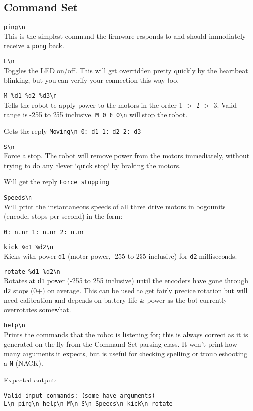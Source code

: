 \subsection{Command Set}

\verb|ping\n|\\
This is the simplest command the firmware responds to and should immediately receive a \verb|pong| back.

\verb|L\n|\\
Toggles the LED on/off. This will get overridden pretty quickly by the heartbeat blinking, but you can verify your connection this way too.

\verb|M %d1 %d2 %d3\n|\\
Tells the robot to apply power to the motors in the order 1 $>$ 2 $>$ 3. Valid range is -255 to 255 inclusive. \verb|M 0 0 0\n| will stop the robot.

Gets the reply \verb|Moving\n 0: d1 1: d2 2: d3|

\verb|S\n|\\
Force a stop. The robot will remove power from the motors immediately, without trying to do any clever `quick stop` by braking the motors.

Will get the reply \verb|Force stopping|

\verb|Speeds\n|\\
Will print the instantaneous speeds of all three drive motors in bogounits (encoder stops per second) in the form:

\verb|0: n.nn 1: n.nn 2: n.nn|

\verb|kick %d1 %d2\n|\\
Kicks with power \texttt{d1} (motor power, -255 to 255 inclusive) for \texttt{d2} milliseconds.

\verb|rotate %d1 %d2\n|\\
Rotates at \texttt{d1} power (-255 to 255 inclusive) until the encoders have gone through \texttt{d2} stops (0+) on average. This can be used to get fairly precice rotation but will need calibration and depends on battery life \& power as the bot currently overrotates somewhat.

\verb|help\n|\\
Prints the commands that the robot is listening for; this is always correct as it is generated on-the-fly from the Command Set parsing class. It won't print how many arguments it expects, but is useful for checking spelling or troubleshooting a \texttt{N} (NACK).

Expected output:
\begin{verbatim}
Valid input commands: (some have arguments)
L\n ping\n help\n M\n S\n Speeds\n kick\n rotate
\end{verbatim}
